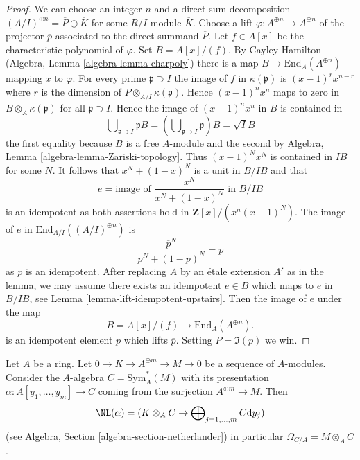 \begin{proof}
We can choose an integer $n$ and a direct sum decomposition
$(A/I)^{\oplus n} = \overline{P} \oplus \overline{K}$
for some $R/I$-module $\overline{K}$. Choose a lift
$\varphi : A^{\oplus n} \to A^{\oplus n}$ of the projector $\overline{p}$
associated to the direct summand $\overline{P}$.
Let $f \in A[x]$ be the characteristic polynomial of $\varphi$.
Set $B = A[x]/(f)$. By Cayley-Hamilton
(Algebra, Lemma \ref{algebra-lemma-charpoly}) there is a map
$B \to \text{End}_A(A^{\oplus n})$ mapping $x$ to $\varphi$.
For every prime $\mathfrak p \supset I$ the image of $f$ in
$\kappa(\mathfrak p)$ is $(x - 1)^rx^{n - r}$ where $r$ is the
dimension of $\overline{P} \otimes_{A/I} \kappa(\mathfrak p)$.
Hence $(x - 1)^nx^n$ maps to zero in $B \otimes_A \kappa(\mathfrak p)$
for all $\mathfrak p \supset I$. Hence the image of $(x - 1)^nx^n$
in $B$ is contained in
$$
\bigcup\nolimits_{\mathfrak p \supset I} \mathfrak pB =
(\bigcup\nolimits_{\mathfrak p \supset I} \mathfrak p)B =
\sqrt{I} B
$$
the first equality because $B$ is a free $A$-module and the second
by Algebra, Lemma \ref{algebra-lemma-Zariski-topology}.
Thus $(x - 1)^N x^N$ is contained in $IB$ for some $N$.
It follows that $x^N + (1 - x)^N$ is a unit in $B/IB$ and that
$$
\overline{e} = \text{image of }\frac{x^N}{x^N + (1 - x)^N}\text{ in }B/IB
$$
is an idempotent as both assertions hold in $\mathbf{Z}[x]/(x^n(x - 1)^N)$.
The image of $\overline{e}$ in $\text{End}_{A/I}((A/I)^{\oplus n})$ is
$$
\frac{\overline{p}^N}{\overline{p}^N + (1 - \overline{p})^N} = \overline{p}
$$
as $\overline{p}$ is an idempotent. After replacing $A$ by an \'etale
extension $A'$ as in the lemma, we may assume there exists an idempotent
$e \in B$ which maps to $\overline{e}$ in $B/IB$, see
Lemma \ref{lemma-lift-idempotent-upstairs}.
Then the image of $e$ under the map
$$
B = A[x]/(f) \longrightarrow \text{End}_A(A^{\oplus n}).
$$
is an idempotent element $p$ which lifts $\overline{p}$.
Setting $P = \Im(p)$ we win.
\end{proof}

\begin{lemma}
\label{lemma-cotangent-complex-symmetric-algebra}
Let $A$ be a ring. Let $0 \to K \to A^{\oplus m} \to M \to 0$
be a sequence of $A$-modules. Consider the $A$-algebra
$C = \text{Sym}^*_A(M)$ with its presentation
$\alpha : A[y_1, \ldots, y_m] \to C$
coming from the surjection $A^{\oplus m} \to M$. Then
$$
\NL(\alpha) =
(K \otimes_A C \to \bigoplus\nolimits_{j = 1, \ldots, m} C \text{d}y_j)
$$
(see Algebra, Section \ref{algebra-section-netherlander})
in particular $\Omega_{C/A} = M \otimes_A C$.
\end{lemma}

